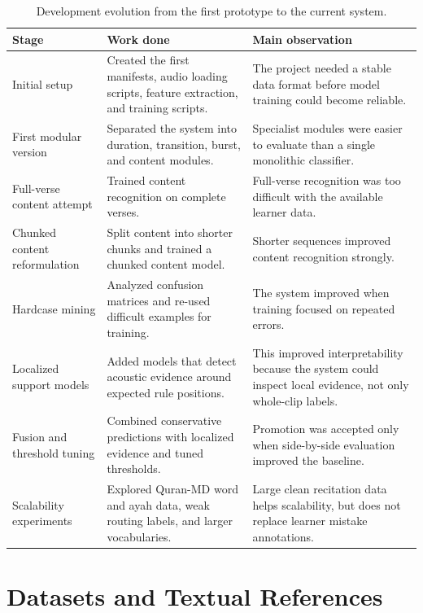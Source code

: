 \documentclass[12pt,a4paper]{report}
\begin{document}
\begin{table}[H]
\centering
\small
\begin{tabularx}{\textwidth}{p{} X X}
\toprule
\textbf{Stage} & \textbf{Work done} & \textbf{Main observation} \\
\midrule
Initial setup &
Created the first manifests, audio loading scripts, feature extraction, and
training scripts. &
The project needed a stable data format before model training could become
reliable. \\
\midrule
First modular version &
Separated the system into duration, transition, burst, and content modules. &
Specialist modules were easier to evaluate than a single monolithic classifier. \\
\midrule
Full-verse content attempt &
Trained content recognition on complete verses. &
Full-verse recognition was too difficult with the available learner data. \\
\midrule
Chunked content reformulation &
Split content into shorter chunks and trained a chunked content model. &
Shorter sequences improved content recognition strongly. \\
\midrule
Hardcase mining &
Analyzed confusion matrices and re-used difficult examples for training. &
The system improved when training focused on repeated errors. \\
\midrule
Localized support models &
Added models that detect acoustic evidence around expected rule positions. &
This improved interpretability because the system could inspect local evidence,
not only whole-clip labels. \\
\midrule
Fusion and threshold tuning &
Combined conservative predictions with localized evidence and tuned thresholds. &
Promotion was accepted only when side-by-side evaluation improved the baseline. \\
\midrule
Scalability experiments &
Explored Quran-MD word and ayah data, weak routing labels, and larger
vocabularies. &
Large clean recitation data helps scalability, but does not replace learner
mistake annotations. \\
\bottomrule
\end{tabularx}
\caption{Development evolution from the first prototype to the current system.}
\label{tab:development_evolution}
\end{table}

\section{Datasets and Textual References}
\end{document}
